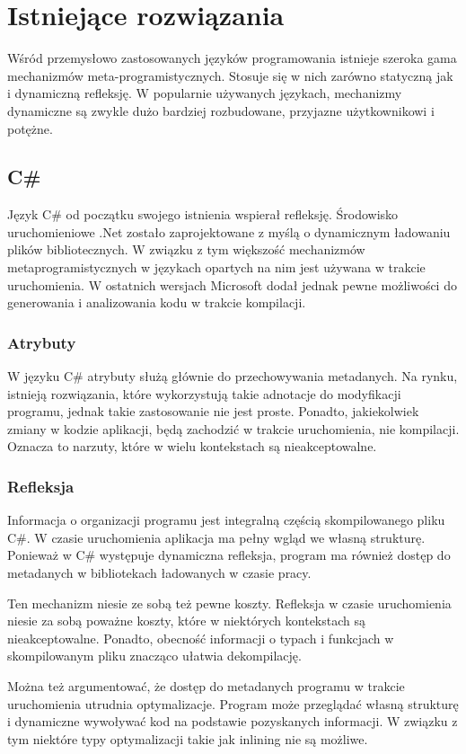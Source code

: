 \section{Istniejące rozwiązania}
Wśród przemysłowo zastosowanych języków programowania istnieje szeroka gama mechanizmów meta-programistycznych. Stosuje się w nich zarówno statyczną jak i dynamiczną refleksję. W popularnie używanych językach, mechanizmy dynamiczne są zwykle dużo bardziej rozbudowane, przyjazne użytkownikowi i potężne.


\subsection{C\#}
Język C\# od początku swojego istnienia wspierał refleksję.
Środowisko uruchomieniowe .Net zostało zaprojektowane z myślą o dynamicznym ładowaniu plików bibliotecznych.
W związku z tym większość mechanizmów metaprogramistycznych w językach opartych na nim jest używana w trakcie uruchomienia.
W ostatnich wersjach Microsoft dodał jednak pewne możliwości do generowania i analizowania kodu w trakcie kompilacji.
\subsubsection{Atrybuty}
W języku C\# atrybuty służą głównie do przechowywania metadanych.
Na rynku, istnieją rozwiązania, które wykorzystują takie adnotacje do modyfikacji programu, jednak takie zastosowanie nie jest proste.
Ponadto, jakiekolwiek zmiany w kodzie aplikacji, będą zachodzić w trakcie uruchomienia, nie kompilacji.
Oznacza to narzuty, które w wielu kontekstach są nieakceptowalne.
\subsubsection{Refleksja}

Informacja o organizacji programu jest integralną częścią skompilowanego pliku C\#.
W czasie uruchomienia aplikacja ma pełny wgląd we własną strukturę.
Ponieważ w C\# występuje dynamiczna refleksja, program ma również dostęp do metadanych w bibliotekach ładowanych w czasie pracy.

Ten mechanizm niesie ze sobą też pewne koszty.
Refleksja w czasie uruchomienia niesie za sobą poważne koszty, które w niektórych kontekstach są nieakceptowalne.
Ponadto, obecność informacji o typach i funkcjach w skompilowanym pliku znacząco ułatwia dekompilację.

Można też argumentować, że dostęp do metadanych programu w trakcie uruchomienia utrudnia optymalizacje.
Program może przeglądać własną strukturę i dynamiczne wywoływać kod na podstawie pozyskanych informacji.
W związku z tym niektóre typy optymalizacji takie jak inlining nie są możliwe.

